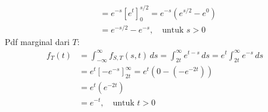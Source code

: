 \documentclass[11pt,letterpaper]{article}
\begin{document}
\begin{enumerate}
\begin{enumerate}[label=\alph*)]
\begin{align*}
                         & = e^{-s} [e^t]_{0}^{s/2} = e^{-s} (e^{s/2} - e^0)                                                          \\
                         & = e^{-s/2} - e^{-s}, \quad \text{untuk } s > 0
                \end{align*}
                Pdf marginal dari $T$:
                \begin{align*}
                  f_T(t) & = \int_{-\infty}^{\infty} f_{S,T}(s,t) \,ds = \int_{2t}^{\infty} e^{t-s} \,ds = e^t \int_{2t}^{\infty} e^{-s} \,ds \\
                         & = e^t [-e^{-s}]_{2t}^{\infty} = e^t (0 - (-e^{-2t}))                                                               \\
                         & = e^t (e^{-2t})                                                                                                    \\
                         & = e^{-t}, \quad \text{untuk } t > 0
                \end{align*}
        \end{enumerate}
\end{enumerate}
\end{document}
